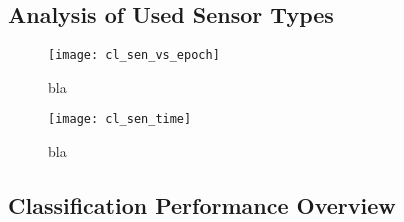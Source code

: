 \subsection{Analysis of Used Sensor Types} \label{ssec:analysis_of_used_sensor_types}

\begin{figure}[H]
  \centering
  \texttt{[image: cl\_sen\_vs\_epoch]}
  \caption{bla}
  \label{fig:sen_vs_epoch}
\end{figure}

\begin{figure}[H]
  \centering
  \texttt{[image: cl\_sen\_time]}
  \caption{bla}
  \label{fig:sen_time}
\end{figure}

\subsection{Classification Performance Overview} \label{ssec:results_overview}

